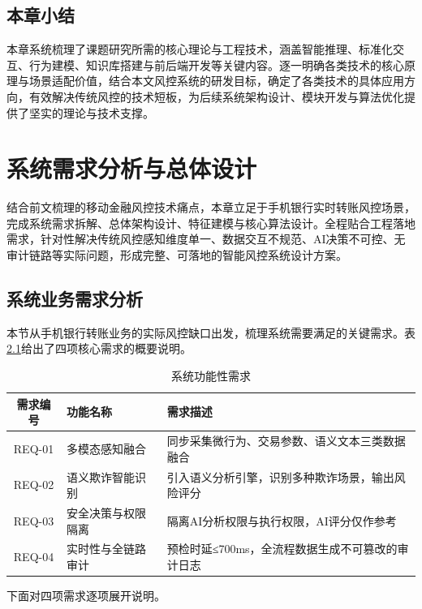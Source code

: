 \documentclass{xduugthesis}
\begin{document}
\section{本章小结}
本章系统梳理了课题研究所需的核心理论与工程技术，涵盖智能推理、标准化交互、行为建模、知识库搭建与前后端开发等关键内容。逐一明确各类技术的核心原理与场景适配价值，结合本文风控系统的研发目标，确定了各类技术的具体应用方向，有效解决传统风控的技术短板，为后续系统架构设计、模块开发与算法优化提供了坚实的理论与技术支撑。

\chapter{系统需求分析与总体设计}

结合前文梳理的移动金融风控技术痛点，本章立足于手机银行实时转账风控场景，完成系统需求拆解、总体架构设计、特征建模与核心算法设计。全程贴合工程落地需求，针对性解决传统风控感知维度单一、数据交互不规范、AI决策不可控、无审计链路等实际问题，形成完整、可落地的智能风控系统设计方案。

\section{系统业务需求分析}

本节从手机银行转账业务的实际风控缺口出发，梳理系统需要满足的关键需求。表\ref{tab:functional-requirement}给出了四项核心需求的概要说明。

\begin{table}[H]
    \centering
    \caption{系统功能性需求}
    \label{tab:functional-requirement}
    \begin{tabular}{|c|p{3cm}|p{6cm}|}
        \hline
        需求编号 & 功能名称 & 需求描述 \\
        \hline
        REQ-01 & 多模态感知融合 & 
        同步采集微行为、交易参数、语义文本三类数据融合\\
        \hline
        REQ-02 & 语义欺诈智能识别 & 
        引入语义分析引擎，识别多种欺诈场景，输出风险评分 \\
        \hline
        REQ-03 & 安全决策与权限隔离 & 
        隔离AI分析权限与执行权限，AI评分仅作参考 \\
        \hline
        REQ-04 & 实时性与全链路审计 & 
        预检时延≤700ms，全流程数据生成不可篡改的审计日志\\
        \hline
    \end{tabular}
\end{table}

下面对四项需求逐项展开说明。
\end{document}
